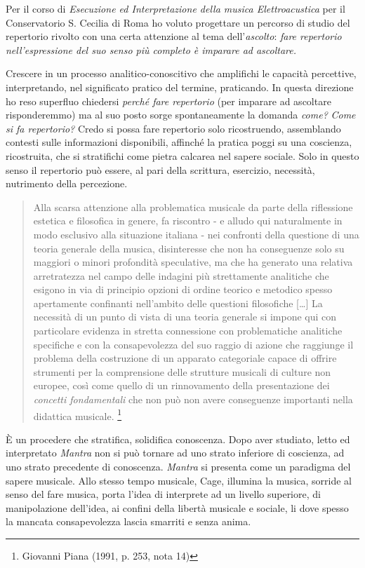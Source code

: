 \documentclass[
	10pt,
	a4paper,
	twocolumn
	]{article}
\begin{document}
Per il corso di \emph{Esecuzione ed Interpretazione della musica Elettroacustica} per il Conservatorio S. Cecilia di Roma ho voluto progettare un percorso di studio del repertorio rivolto con una certa attenzione al tema dell'\emph{ascolto}: \emph{fare repertorio nell'espressione del suo senso pi\`u completo \`e imparare ad ascoltare.}

Crescere in un processo analitico-conoscitivo che amplifichi le capacità percettive, interpretando, nel significato pratico del termine, praticando. In questa direzione ho reso superfluo chiedersi \emph{perché fare repertorio} (per imparare ad ascoltare risponderemmo) ma al suo posto sorge spontaneamente la domanda \emph{come?} \emph{Come si fa repertorio?} Credo si possa fare repertorio solo ricostruendo, assemblando contesti sulle informazioni disponibili, affinch\'e la pratica poggi su una coscienza, ricostruita, che si stratifichi come pietra calcarea nel sapere sociale. Solo in questo senso il repertorio può essere, al pari della scrittura, esercizio, necessità, nutrimento della percezione.

\begin{quote}
	Alla scarsa attenzione alla problematica musicale da parte della riflessione estetica e filosofica in genere, fa riscontro - e alludo qui naturalmente in modo esclusivo alla situazione italiana - nei confronti della questione di una teoria generale della musica, disinteresse che non ha conseguenze solo su maggiori o minori profondità speculative, ma che ha generato una relativa arretratezza nel campo delle indagini pi\`u strettamente analitiche che esigono in via di principio opzioni di ordine teorico e metodico spesso apertamente confinanti nell'ambito delle questioni filosofiche [\ldots] La necessità di un punto di vista di una teoria generale si impone qui con particolare evidenza in stretta connessione con problematiche analitiche specifiche e con la consapevolezza del suo raggio di azione che raggiunge il problema della costruzione di un apparato categoriale capace di offrire strumenti per la comprensione delle strutture musicali di culture non europee, così come quello di un  rinnovamento della presentazione dei \emph{concetti fondamentali} che non può non avere conseguenze importanti nella didattica musicale. \footnote{Giovanni Piana (1991, p. 253, nota 14)}
\end{quote}

È un procedere che stratifica, solidifica conoscenza. Dopo aver studiato, letto ed interpretato \emph{Mantra} non si può tornare ad uno strato inferiore di coscienza, ad uno strato precedente di conoscenza. \emph{Mantra} si presenta come un paradigma del sapere musicale. Allo stesso tempo musicale, Cage, illumina la musica, sorride al senso del fare musica, porta l'idea di interprete ad un livello superiore, di manipolazione dell'idea, ai confini della libertà musicale e sociale, li dove spesso la mancata consapevolezza lascia smarriti e senza anima.
\end{document}
